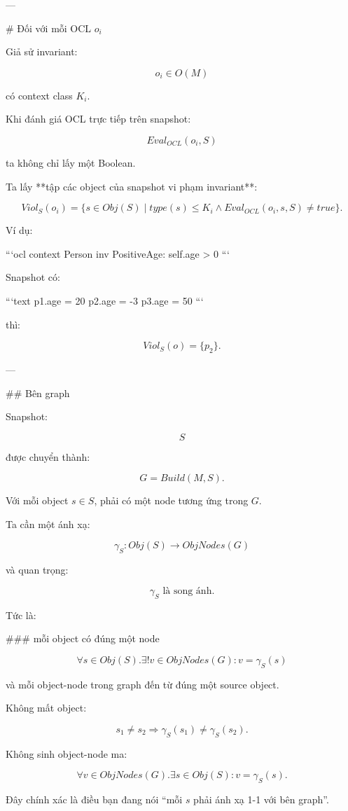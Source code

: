 ---

# Đối với mỗi OCL \(o_i\)

Giả sử invariant:

$$
o_i\in O(M)
$$

có context class \(K_i\).

Khi đánh giá OCL trực tiếp trên snapshot:

$$
Eval_{OCL}(o_i,S)
$$

ta không chỉ lấy một Boolean.

Ta lấy **tập các object của snapshot vi phạm invariant**:

$$
\boxed{
Viol_S(o_i)
=
\{
s\in Obj(S)
\mid
type(s)\leq K_i
\land
Eval_{OCL}(o_i,s,S)\neq true
\}.
}
$$

Ví dụ:

```ocl
context Person inv PositiveAge:
    self.age > 0
```

Snapshot có:

```text
p1.age = 20
p2.age = -3
p3.age = 50
```

thì:

$$
Viol_S(o)=\{p_2\}.
$$

---

## Bên graph

Snapshot:

$$
S
$$

được chuyển thành:

$$
G=Build(M,S).
$$

Với mỗi object \(s\in S\), phải có một node tương ứng trong \(G\).

Ta cần một ánh xạ:

$$
\boxed{
\gamma_S:Obj(S)\rightarrow ObjNodes(G)
}
$$

và quan trọng:

$$
\boxed{
\gamma_S
\text{ là song ánh}.
}
$$

Tức là:

### mỗi object có đúng một node

$$
\forall s\in Obj(S).
\exists!v\in ObjNodes(G):
v=\gamma_S(s)
$$

và mỗi object-node trong graph đến từ đúng một source object.

Không mất object:

$$
s_1\neq s_2
\Rightarrow
\gamma_S(s_1)\neq\gamma_S(s_2).
$$

Không sinh object-node ma:

$$
\forall v\in ObjNodes(G).
\exists s\in Obj(S):
v=\gamma_S(s).
$$

Đây chính xác là điều bạn đang nói “mỗi \(s\) phải ánh xạ 1-1 với bên graph”.

